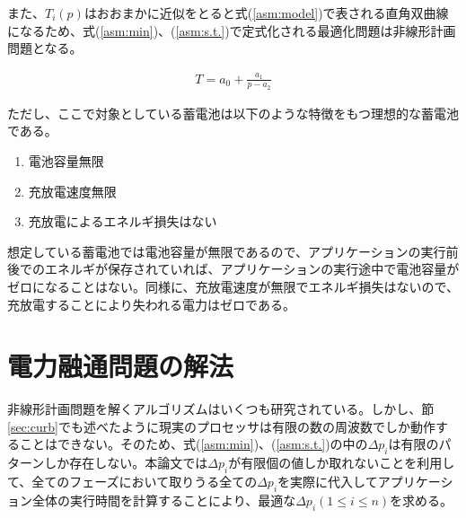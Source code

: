 また、$T_i(p)$はおおまかに近似をとると式(\ref{asm:model})で表される直角双曲線になるため、式(\ref{asm:min})、(\ref{asm:s.t.})で定式化される最適化問題は非線形計画問題となる。

\begin{eqnarray}
T = a_0 + \frac{a_1}{p-a_2} \label{asm:model}
\end{eqnarray}

ただし、ここで対象としている蓄電池は以下のような特徴をもつ理想的な蓄電池である。

\begin{enumerate}
\item 電池容量無限
\item 充放電速度無限
\item 充放電によるエネルギ損失はない
\end{enumerate}

想定している蓄電池では電池容量が無限であるので、アプリケーションの実行前後でのエネルギが保存されていれば、アプリケーションの実行途中で電池容量がゼロになることはない。同様に、充放電速度が無限でエネルギ損失はないので、充放電することにより失われる電力はゼロである。


\section{電力融通問題の解法}
\label{sec:algorithm}

非線形計画問題を解くアルゴリズムはいくつも研究されている。しかし、節\ref{sec:curb}でも述べたように現実のプロセッサは有限の数の周波数でしか動作することはできない。そのため、式(\ref{asm:min})、(\ref{asm:s.t.})の中の$\Delta p_i$は有限のパターンしか存在しない。本論文では$\Delta p_i$が有限個の値しか取れないことを利用して、全てのフェーズにおいて取りうる全ての$\Delta p_i$を実際に代入してアプリケーション全体の実行時間を計算することにより、最適な$\Delta p_i(1 \leq i \leq n)$を求める。






